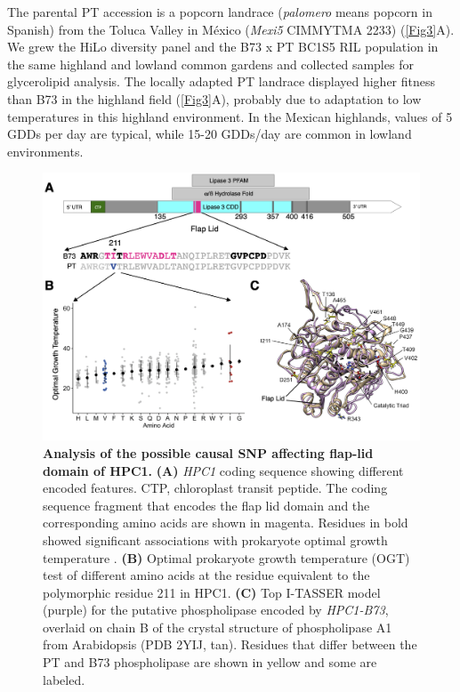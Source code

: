 \documentclass[9pt,twocolumn,twoside,lineno]{biorxiv}
\newcommand{\hpc}{\textit{HPC1}\xspace}
\begin{document}
The parental PT accession is a popcorn landrace (\textit{palomero} means popcorn in Spanish) from the Toluca Valley in M\'exico (\textit{Mexi5} CIMMYTMA 2233) (\cref{Fig3}A). 
We grew the HiLo diversity panel and the B73 x PT BC1S5 RIL population in the same highland and lowland common gardens and collected samples for glycerolipid analysis.
The locally adapted PT landrace displayed higher fitness than B73 in the highland field (\cref{Fig3}A), probably due to adaptation to low temperatures in this highland environment.  
In the Mexican highlands, values of 5 GDDs per day are typical, while 15-20 GDDs/day are common in lowland environments. 
\begin{figure}[ht]
\centering
\includegraphics[width=0.4\paperwidth]{Figures/Fig_4.png}
\caption{\textbf{Analysis of the possible causal SNP affecting flap-lid domain of HPC1.} 
\textbf{(A)} \hpc coding sequence showing different encoded features. 
CTP, chloroplast transit peptide. 
The coding sequence fragment that encodes the flap lid domain and the corresponding amino acids are shown in magenta.
Residues in bold showed significant associations with prokaryote optimal growth temperature \cite{Jensen2021-iv, Jensen2021-zm}.
\textbf{(B)} Optimal prokaryote growth temperature (OGT) test of different amino acids at the residue equivalent to the polymorphic residue 211 in HPC1.
\textbf{(C)} Top I-TASSER model (purple) for the putative phospholipase encoded by \textit{HPC1-B73}, overlaid on chain B of the crystal structure of phospholipase A1 from
Arabidopsis (PDB 2YIJ, tan). 
Residues that differ between the PT and B73 phospholipase are shown in yellow and some are labeled.} 
\label{Fig4}
\end{figure}
\end{document}
